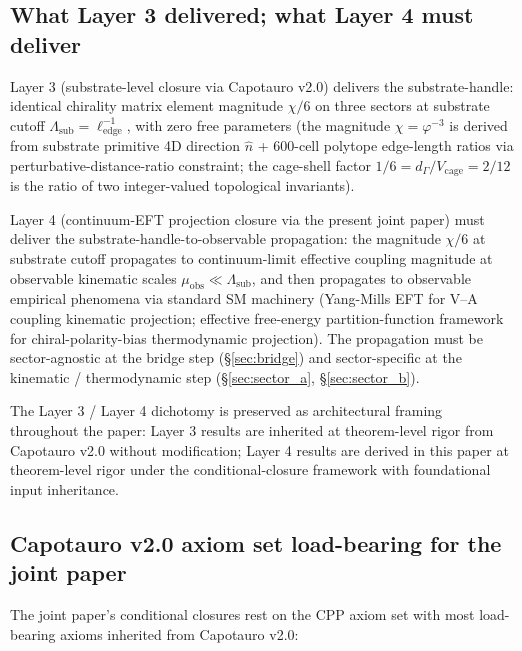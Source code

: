 \documentclass[11pt,letterpaper]{article}
\newcommand{\Lambdasub}{\Lambda_{\text{sub}}}
\newcommand{\muobs}{\mu_{\text{obs}}}
\newcommand{\elledge}{\ell_{\text{edge}}}
\newcommand{\Vcage}{V_{\text{cage}}}
\newcommand{\dGamma}{d_\Gamma}
\begin{document}
\subsection{What Layer 3 delivered; what Layer 4 must deliver}
\label{sec:layer3_layer4}

Layer 3 (substrate-level closure via Capotauro v2.0) delivers the substrate-handle: identical chirality matrix element magnitude $\chi/6$ on three sectors at substrate cutoff $\Lambdasub = \elledge^{-1}$, with zero free parameters (the magnitude $\chi = \varphi^{-3}$ is derived from substrate primitive 4D direction $\hat{n}$ + 600-cell polytope edge-length ratios via perturbative-distance-ratio constraint; the cage-shell factor $1/6 = \dGamma/\Vcage = 2/12$ is the ratio of two integer-valued topological invariants).

Layer 4 (continuum-EFT projection closure via the present joint paper) must deliver the substrate-handle-to-observable propagation: the magnitude $\chi/6$ at substrate cutoff propagates to continuum-limit effective coupling magnitude at observable kinematic scales $\muobs \ll \Lambdasub$, and then propagates to observable empirical phenomena via standard SM machinery (Yang-Mills EFT for V--A coupling kinematic projection; effective free-energy partition-function framework for chiral-polarity-bias thermodynamic projection). The propagation must be sector-agnostic at the bridge step (§\ref{sec:bridge}) and sector-specific at the kinematic / thermodynamic step (§\ref{sec:sector_a}, §\ref{sec:sector_b}).

The Layer 3 / Layer 4 dichotomy is preserved as architectural framing throughout the paper: Layer 3 results are inherited at theorem-level rigor from Capotauro v2.0 without modification; Layer 4 results are derived in this paper at theorem-level rigor under the conditional-closure framework with foundational input inheritance.

\subsection{Capotauro v2.0 axiom set load-bearing for the joint paper}
\label{sec:axiom_inheritance}

The joint paper's conditional closures rest on the CPP axiom set \cite{AxiomDocument} with most load-bearing axioms inherited from Capotauro v2.0:
\end{document}
